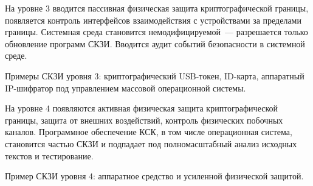На уровне 3 вводится пассивная физическая защита криптографической границы,
появляется контроль интерфейсов взаимодействия с устройствами за пределами 
границы. Системная среда становится немодифицируемой~--- разрешается только 
обновление программ СКЗИ. Вводится аудит событий безопасности в системной среде.

Примеры СКЗИ уровня 3: криптографический USB-токен, ID-карта, 
аппаратный IP-шифратор под управлением массовой операционной системы.

На уровне 4 появляются активная физическая защита криптографической границы,
защита от внешних воздействий, 
контроль физических побочных каналов.
%
Программное обеспечение КСК, в том числе операционная система, становится 
частью СКЗИ и подпадает под полномасштабный анализ исходных текстов и 
тестирование. 
%

Пример СКЗИ уровня 4: аппаратное средство 
и усиленной физической защитой. 

